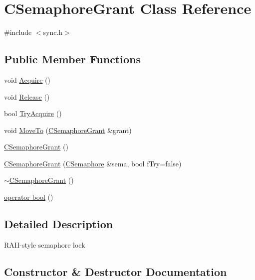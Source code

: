 \hypertarget{class_c_semaphore_grant}{}\section{C\+Semaphore\+Grant Class Reference}
\label{class_c_semaphore_grant}


{\ttfamily \#include $<$sync.\+h$>$}

\subsection*{Public Member Functions}
\begin{DoxyCompactItemize}
\item 
void \hyperlink{class_c_semaphore_grant_ac52976968379ea8e2470cfba877c3e89}{Acquire} ()
\item 
void \hyperlink{class_c_semaphore_grant_a8d985eeace74e037baeb39bd2d586576}{Release} ()
\item 
bool \hyperlink{class_c_semaphore_grant_a9952d9ea087ced803c099f69992ebb1d}{Try\+Acquire} ()
\item 
void \hyperlink{class_c_semaphore_grant_ab3e6f84f304703abc52517b0c8de26cf}{Move\+To} (\hyperlink{class_c_semaphore_grant}{C\+Semaphore\+Grant} \&grant)
\item 
\hyperlink{class_c_semaphore_grant_a84ca79a4c8519f1a69697c060cabc51d}{C\+Semaphore\+Grant} ()
\item 
\hyperlink{class_c_semaphore_grant_a5998c457c7c223a8257166161d12b355}{C\+Semaphore\+Grant} (\hyperlink{class_c_semaphore}{C\+Semaphore} \&sema, bool f\+Try=false)
\item 
\hyperlink{class_c_semaphore_grant_aaba5579eb3ad3647d79e71c9970dcb54}{$\sim$\+C\+Semaphore\+Grant} ()
\item 
\hyperlink{class_c_semaphore_grant_a91458b860e45949d87d770252e590a9b}{operator bool} ()
\end{DoxyCompactItemize}


\subsection{Detailed Description}
R\+A\+I\+I-\/style semaphore lock 

\subsection{Constructor \& Destructor Documentation}
\hypertarget{class_c_semaphore_grant_a84ca79a4c8519f1a69697c060cabc51d}{}
